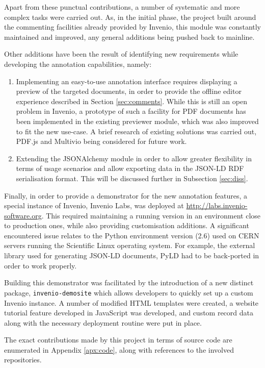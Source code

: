 Apart from these punctual contributions, a number of systematic and more
complex tasks were carried out. As, in the initial phase, the project built
around the commenting facilities already provided by Invenio, this module was
constantly maintained and improved, any general additions being pushed
back to mainline.

Other additions have been the result of identifying new requirements while
developing the annotation capabilities, namely:
\begin{enumerate}
  \item Implementing an easy-to-use annotation interface requires displaying a
        preview of the targeted documents, in order to provide the offline
        editor experience described in Section \ref{sec:comments}. While this
        is still an open problem in Invenio, a prototype of such a facility for
        PDF documents has been implemented in the existing previewer module,
        which was also improved to fit the new use-case. A brief research of
        existing solutions was carried out, PDF.js \cite{ref:pdfjs} and Multivio
        \cite{ref:multivio} being considered for future work.
  \item Extending the JSONAlchemy module in order to allow greater
        flexibility in terms of usage scenarios and allow exporting data in
        the JSON-LD RDF serialisation format. This will be discussed further in
        Subsection \ref{sec:diss}.
\end{enumerate}

Finally, in order to provide a demonstrator for the new annotation features, a
special instance of Invenio, Invenio Labs, was deployed at
\url{http://labs.invenio-software.org}. This required maintaining a running
version in an environment close to production ones, while also providing
customisation additions. A significant encountered issue relates to the Python
environment version (2.6) used on CERN servers running the Scientific Linux
operating system. For example, the external library used for generating JSON-LD
documents, PyLD \cite{ref:pyld} had to be back-ported in order to work
properly.

Building this demonstrator was facilitated by the introduction of a new
distinct package, \texttt{invenio-demosite} which allows developers to quickly
set up a custom Invenio instance. A number of modified HTML templates were
created, a website tutorial feature developed in JavaScript was developed, and
custom record data along with the necessary deployment routine were put in
place.

The exact contributions made by this project in terms of source code are
enumerated in Appendix \ref{apx:code}, along with references to the involved
repositories.
